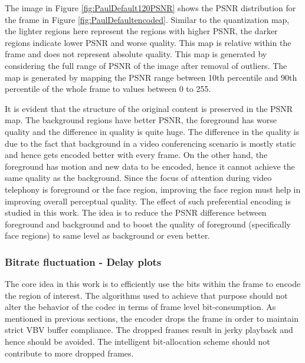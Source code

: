 \documentclass[11pt]{article} %
\begin{document}
The image in Figure \ref{fig:PaulDefault120PSNR} shows the PSNR distribution for the frame in Figure \ref{fig:PaulDefaultencoded}. Similar to the quantization map, the lighter regions here represent the regions with higher PSNR, the darker regions indicate lower PSNR and worse quality. This map is relative within the frame and does not represent  absolute quality. This map is generated by considering the full range of PSNR of the image after removal of outliers. The map is generated by mapping the PSNR range between 10th percentile and 90th percentile of the whole frame to values between 0 to 255.

It is evident that the structure of the original content is preserved in the PSNR map. The background regions have better PSNR, the foreground has worse quality and the difference in quality is quite huge. The difference in the quality is due to the fact that background in a video conferencing scenario is mostly static and hence gets encoded better with every frame. On the other hand, the foreground has motion and new data to be encoded, hence it cannot achieve the same quality as the background. Since the focus of attention during video telephony is foreground or the face region, improving the face region must help in improving overall perceptual quality. The effect of such preferential encoding is studied in this work. The idea is to reduce the PSNR difference between foreground and background and to boost the quality of foreground (specifically face regions) to same level as background or even better.
\subsubsection{Bitrate fluctuation - Delay plots}
The core idea in this work is to efficiently use the bits within the frame to encode the region of interest. The algorithms used to achieve that purpose should not alter the behavior of the codec in terms of frame level bit-consumption. As mentioned in previous sections, the encoder drops the frame in order to maintain strict VBV buffer compliance. The dropped frames result in jerky playback and hence should be avoided. The intelligent bit-allocation scheme should not contribute to more dropped frames.
\end{document}
